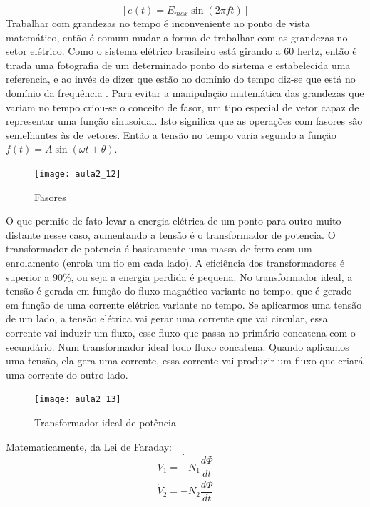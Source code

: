 \begin{equation}\label{eq:omega11}
[e(t)=E_{max}\sin(2\pi ft)]
\end{equation}
Trabalhar com grandezas no tempo é inconveniente no ponto de vista
matemático, então é comum mudar a forma de trabalhar com as grandezas
no setor elétrico. Como o sistema elétrico brasileiro está girando a 60 hertz,
então é tirada uma fotografia de um determinado ponto do sistema e
estabelecida
uma referencia, e ao invés de dizer que estão no domínio do tempo diz-se
que está no domínio da frequência . 
Para evitar a manipulação matemática das grandezas que variam no tempo
criou-se o conceito de fasor, um tipo especial de vetor capaz de representar
uma função sinusoidal. Isto significa que as operações com fasores
são semelhantes às de vetores.
Então a tensão no tempo varia segundo a função $f(t)=A\sin(\omega t+\theta)$.
\begin{figure}[H]
\begin{centering}
\texttt{[image: aula2\_12]}\protect\caption{\label{fig:aula2_12}Fasores }
\end{centering}
\end{figure}
O que permite de fato levar a energia elétrica de um ponto para outro
muito distante nesse caso, aumentando a tensão é o transformador
de potencia.
O transformador de potencia é basicamente uma massa de ferro com um
enrolamento (enrola um fio em cada lado). A eficiência dos transformadores é
superior a 90\%, ou seja a energia perdida é pequena.
No transformador ideal, a tensão é gerada em função do fluxo magnético
variante no tempo, que é gerado em
função de uma corrente elétrica variante no tempo.
Se aplicarmos uma tensão de um lado, a tensão elétrica vai gerar uma
corrente que vai circular, essa corrente vai induzir um fluxo, esse
fluxo que passa no primário concatena com o secundário. Num transformador
ideal todo fluxo concatena. Quando aplicamos uma tensão, ela gera uma corrente, essa corrente vai produzir um fluxo que criará uma corrente do outro lado.
\begin{figure}[H]
\begin{centering}
\texttt{[image: aula2\_13]}\protect\caption{\label{fig:aula2_13}Transformador ideal de potência}
\end{centering}
\end{figure}

Matematicamente, da Lei de Faraday:
\begin{equation}\label{eq:lf}
\dot{\dot{V}_{1}=-N_{1}\frac{d\Phi}{dt}}
\end{equation}
\begin{equation}\label{eq:lf2}
\dot{\dot{V}_{2}=-N_{2}\frac{d\Phi}{dt}}
\end{equation}



